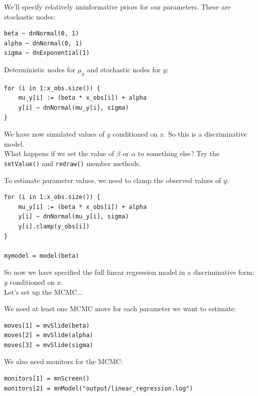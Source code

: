 \documentclass[mathserif]{beamer}
\begin{document}
\begin{frame}[fragile]
    We'll specify relatively uninformative priors for our parameters. These are stochastic nodes:\\
    \bigskip
    \begin{lstlisting}
beta ~ dnNormal(0, 1)
alpha ~ dnNormal(0, 1)
sigma ~ dnExponential(1)
    \end{lstlisting}
\end{frame}


\begin{frame}[fragile]
Deterministic nodes for $\mu_y$ and stochastic nodes for $y$:\\
    \bigskip
    \begin{lstlisting}
for (i in 1:x_obs.size()) {
    mu_y[i] := (beta * x_obs[i]) + alpha
    y[i] ~ dnNormal(mu_y[i], sigma)
}
    \end{lstlisting}
\bigskip
    We have now simulated values of $y$ conditioned on $x$. 
    So this is a \alert{discriminative} model.  \\
\bigskip
What happens if we set the value of $\beta$ or $\alpha$ to something else?
    Try the \texttt{setValue()} and \texttt{redraw()} member methods.
\end{frame}


\begin{frame}[fragile]
To estimate parameter values, we need to \alert{clamp}
the observed values of $y$:
    \bigskip
    \begin{lstlisting}
for (i in 1:x_obs.size()) {
    mu_y[i] := (beta * x_obs[i]) + alpha
    y[i] ~ dnNormal(mu_y[i], sigma)
    y[i].clamp(y_obs[i])
}

mymodel = model(beta)
    \end{lstlisting}
\bigskip
    So now we have specified the full linear regression model in a \alert{discriminative} form: $y$ conditioned on $x$.  \\
\bigskip
Let's set up the MCMC...
\end{frame}


\begin{frame}[fragile]
We need at least one MCMC move for each parameter we want to estimate:
    \bigskip
    \begin{lstlisting}
moves[1] = mvSlide(beta)
moves[2] = mvSlide(alpha)
moves[3] = mvSlide(sigma)
    \end{lstlisting}
\bigskip
We also need monitors for the MCMC:
    \bigskip
    \begin{lstlisting}
monitors[1] = mnScreen()
monitors[2] = mnModel("output/linear_regression.log")
    \end{lstlisting}
\end{frame}
\end{document}
